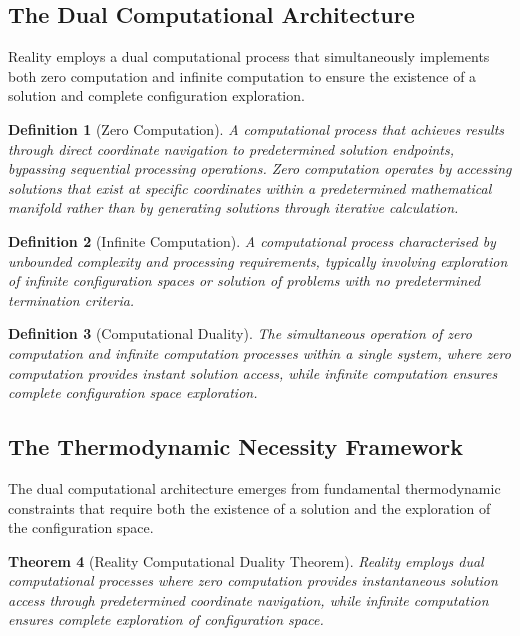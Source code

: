 \documentclass[12pt,a4paper]{article}
\newtheorem{theorem}{Theorem}[section]
\newtheorem{definition}[theorem]{Definition}
\begin{document}
\subsection{The Dual Computational Architecture}

Reality employs a dual computational process that simultaneously implements both zero computation and infinite computation to ensure the existence of a solution and complete configuration exploration.

\begin{definition}[Zero Computation]
A computational process that achieves results through direct coordinate navigation to predetermined solution endpoints, bypassing sequential processing operations. Zero computation operates by accessing solutions that exist at specific coordinates within a predetermined mathematical manifold rather than by generating solutions through iterative calculation.
\end{definition}

\begin{definition}[Infinite Computation]
A computational process characterised by unbounded complexity and processing requirements, typically involving exploration of infinite configuration spaces or solution of problems with no predetermined termination criteria.
\end{definition}

\begin{definition}[Computational Duality]
The simultaneous operation of zero computation and infinite computation processes within a single system, where zero computation provides instant solution access, while infinite computation ensures complete configuration space exploration.
\end{definition}

\subsection{The Thermodynamic Necessity Framework}

The dual computational architecture emerges from fundamental thermodynamic constraints that require both the existence of a solution and the exploration of the configuration space.

\begin{theorem}[Reality Computational Duality Theorem]
Reality employs dual computational processes where zero computation provides instantaneous solution access through predetermined coordinate navigation, while infinite computation ensures complete exploration of configuration space.
\end{theorem}
\end{document}
